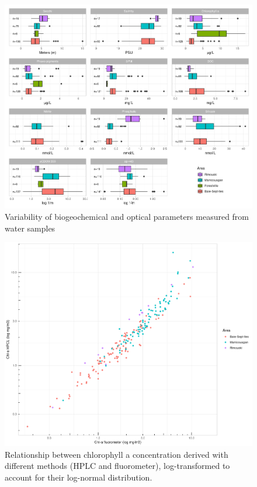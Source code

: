 \documentclass[essd, manuscript]{copernicus}
\begin{document}
\begin{figure}[t]
    \includegraphics[width=18cm]{Figures/boxplot_biogeochem.png}
    \caption{Variability of biogeochemical and optical parameters measured from water samples}
    \label{fig:biogeochem}
\end{figure}

\begin{figure}[t]
    \includegraphics[width=12cm]{Figures/scatter_chla.png}
    \caption{Relationship between chlorophyll a concentration derived with different methods (HPLC and fluorometer), log-transformed to account for their log-normal distribution. }
    \label{fig:chlareg}
\end{figure}
\end{document}
